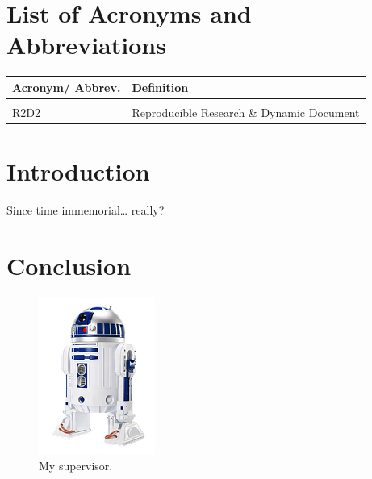\documentclass[
  12pt,
]{article}
\begin{document}
\hypertarget{list-of-acronyms-and-abbreviations}{%
\section*{List of Acronyms and Abbreviations}\label{list-of-acronyms-and-abbreviations}}

\begin{table}[H]
\begin{tabular}{>{\raggedright\arraybackslash}p{2cm}l}
\toprule
\textbf{Acronym/ Abbrev.} & \textbf{Definition}\\
\midrule
\cellcolor{gray!6}{NUTS} & \cellcolor{gray!6}{Nomenclature of Territorial Units for Statistics}\\
R2D2 & Reproducible Research \& Dynamic Document\\
\bottomrule
\end{tabular}
\end{table}

\clearpage
{}\setcounter{page}{1}
\onehalfspacing

\hypertarget{introduction}{%
\section{Introduction}\label{introduction}}

Since time immemorial\ldots{} really?

\clearpage

\hypertarget{conclusion}{%
\section{Conclusion}\label{conclusion}}

\begin{figure}

{\centering \includegraphics[width=0.2\linewidth]{figures/r2d2} 

}

\caption{My supervisor.}\label{fig:r2d2pic}
\end{figure}
\end{document}
